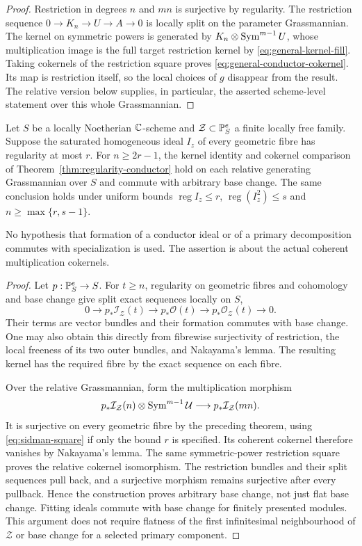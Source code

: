 \begin{proof}
Restriction in degrees $n$ and $mn$ is surjective by regularity.
The restriction sequence $0\to K_n\to U\to A\to0$ is locally
split on the parameter Grassmannian. The kernel on symmetric powers
is generated by $K_n\otimes\operatorname{Sym}^{m-1}U$, whose multiplication image
is the full target restriction kernel by
\eqref{eq:general-kernel-fill}. Taking cokernels of the restriction
square proves \eqref{eq:general-conductor-cokernel}. Its map is
restriction itself, so the local choices of $g$ disappear from the
result. The relative version below supplies, in particular, the
asserted scheme-level statement over this whole Grassmannian.
\end{proof}

\begin{theorem}
\label{thm:relative-regularity-conductor}
Let $S$ be a locally Noetherian $\mathbb C$-scheme and
$\mathcal Z\subset\mathbb P^e_S$ a finite locally free family. Suppose the
saturated homogeneous ideal $I_z$ of every geometric fibre has
regularity at most $r$. For $n\ge2r-1$, the kernel identity and
cokernel comparison of Theorem~\ref{thm:regularity-conductor} hold
on each relative generating Grassmannian over $S$ and commute with
arbitrary base change. The same conclusion holds under uniform
bounds $\operatorname{reg}I_z\le r$, $\operatorname{reg}(I_z^2)\le s$
and $n\ge\max\{r,s-1\}$.

No hypothesis that formation of a conductor ideal or of a primary
decomposition commutes with specialization is used. The assertion
is about the actual coherent multiplication cokernels.
\end{theorem}
\begin{proof}
Let $p:\mathbb P^e_S\to S$. For $t\ge n$, regularity on geometric fibres
and cohomology and base change give split exact sequences locally
on $S$,
\[
 0\longrightarrow p_*\mathcal I_{\mathcal Z}(t)
 \longrightarrow p_*\mathcal O(t)
 \longrightarrow p_*\mathcal O_{\mathcal Z}(t)
 \longrightarrow0.
\]
Their terms are vector bundles and their formation commutes with
base change. One may also obtain this directly from fibrewise
surjectivity of restriction, the local freeness of its two outer
bundles, and Nakayama's lemma. The resulting kernel has the required
fibre by the exact sequence on each fibre.

Over the relative Grassmannian, form the multiplication morphism
\[
 p_*\mathcal I_{\mathcal Z}(n)\otimes\operatorname{Sym}^{m-1}\mathcal U
       \longrightarrow p_*\mathcal I_{\mathcal Z}(mn).
\]
It is surjective on every geometric fibre by the preceding theorem,
using \eqref{eq:sidman-square} if only the bound $r$ is specified.
Its coherent cokernel therefore vanishes by Nakayama's lemma.
The same symmetric-power restriction square proves the relative
cokernel isomorphism. The restriction bundles and their split
sequences pull back, and a surjective morphism remains surjective
after every pullback. Hence the construction proves arbitrary
base change, not just flat base change. Fitting ideals commute with
base change for finitely presented modules. This argument does not
require flatness of the first infinitesimal neighbourhood of
$\mathcal Z$ or base change for a selected primary component.
\end{proof}

